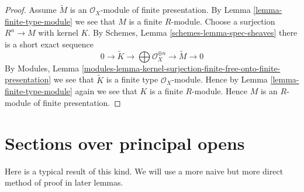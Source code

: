 \begin{proof}
Assume $\widetilde M$ is an $\mathcal{O}_X$-module of finite presentation.
By Lemma \ref{lemma-finite-type-module} we see that $M$ is a finite $R$-module.
Choose a surjection $R^n \to M$ with kernel $K$. By
Schemes, Lemma \ref{schemes-lemma-spec-sheaves}
there is a short exact sequence
$$
0 \to \widetilde{K} \to
\bigoplus \mathcal{O}_X^{\oplus n} \to
\widetilde{M} \to 0
$$
By
Modules, Lemma
\ref{modules-lemma-kernel-surjection-finite-free-onto-finite-presentation}
we see that $\widetilde{K}$ is a finite type $\mathcal{O}_X$-module.
Hence by Lemma \ref{lemma-finite-type-module}
again we see that $K$ is a finite $R$-module.
Hence $M$ is an $R$-module of finite presentation.
\end{proof}







\section{Sections over principal opens}
\label{section-principal-opens}

\noindent
Here is a typical result of this kind. We will use a more naive but
more direct method of proof in later lemmas.

